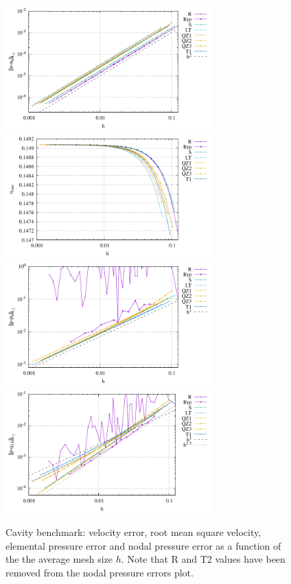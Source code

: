 \documentclass[a4paper,12pt]{article}
\begin{document}
\begin{figure}
\centering
\includegraphics[width=8cm]{../results/errors_u_exp7}
\includegraphics[width=8cm]{../results/vrms_exp7} \\
\includegraphics[width=8cm]{../results/errors_p_exp7}
\includegraphics[width=8cm]{../results/errors_q1_exp7}
\caption{Cavity benchmark: velocity error, 
root mean square velocity, elemental pressure error and nodal pressure error
as a function of the the average mesh size $h$.
Note that R and T2 values have been removed from the nodal pressure errors plot.} 
\label{fig:resexp7}
\end{figure}
\end{document}
